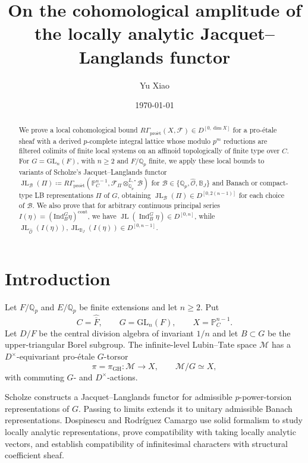 \documentclass[11pt]{article}
\title{On the cohomological amplitude of the locally analytic Jacquet--Langlands functor}
\author{Yu Xiao}
\date{\today}
\theoremstyle{definition}
\newcommand{\Qp}{\mathbb Q_p}
\newcommand{\cM}{\mathcal M}
\newcommand{\Period}{\mathbb P_C^{n-1}}
\newcommand{\proet}{\mathrm{pro\acute et}}
\newcommand{\Ind}{\operatorname{Ind}}
\newcommand{\JL}{\operatorname{JL}}
\begin{document}
\maketitle

\begin{abstract}
We prove a local cohomological bound
\(R\Gamma_{\proet}(X,\mathcal F)\in D^{[0,\dim X]}\)
for a pro-\'etale sheaf with a derived \(p\)-complete integral
lattice whose modulo $p^m$ reductions are filtered colimits of finite local
systems on an affinoid topologically of finite type over $C$. 
For \(G=\mathrm{GL}_n(F)\), with \(n\geq2\) and \(F/\Qp\)
finite, we apply these local bounds to variants of Scholze's Jacquet--Langlands functor  
$\JL_\mathscr{B}(\Pi)\coloneqq R\Gamma_{\proet}(\mathbb{P}^{n-1}_C,\mathcal{F}_{\Pi}\otimes^{L, \square}_{\mathbb{Q}_p}\mathscr{B})$
for $\mathscr{B}\in\{\mathbb{Q}_p, \widehat{\mathscr{O}}, \mathbb{B}_J\}$ 
and Banach or compact-type LB representations $\Pi$ of $G$, obtaining
\(\JL_{\mathscr{B}}(\Pi)\in D^{[0,2(n-1)]}\) for each choice of $\mathscr{B}$. 
We also prove that for arbitrary continuous principal series $I(\eta)=(\mathrm{Ind}_B^G\eta)^{\mathrm{cont}}$, 
we have $\JL(\Ind_B^G\eta)\in D^{[0, n]}$, while $\JL_{\widehat{\mathscr{O}}}(I(\eta)),\JL_{\mathbb{B}_J}(I(\eta))\in D^{[0, n-1]}$.
\end{abstract}

\begingroup
\hypersetup{linkcolor=black}
\tableofcontents
\endgroup
\clearpage

\section*{Introduction}

Let \(F/\Qp\) and \(E/\Qp\) be finite extensions and let
\(n\geq2\). Put
\begin{equation*}
 C=\widehat{\overline F},\qquad
 G=\mathrm{GL}_n(F),\qquad
 X=\Period.
\end{equation*}
Let \(D/F\) be the central division algebra of invariant \(1/n\)
and let $B\subset G$ be the upper-triangular Borel subgroup.
The infinite-level Lubin--Tate space \(\cM\) has a
\(D^\times\)-equivariant pro-\'etale \(G\)-torsor
\begin{equation*}
 \pi=\pi_{\mathrm{GH}}:\cM\longrightarrow X,\qquad
 \cM/G\simeq X,
\end{equation*}
with commuting \(G\)- and \(D^\times\)-actions. 

Scholze \cite{Scholze} constructs a Jacquet--Langlands functor
for admissible $p$-power-torsion representations of $G$.
Passing to limits extends it to unitary admissible Banach
representations.  Dospinescu and Rodr\'iguez Camargo \cite{DRC}
use solid formalism to study locally analytic representations,
prove compatibility with taking locally analytic vectors, and
establish compatibility of infinitesimal characters with structural
coefficient sheaf.
\end{document}

